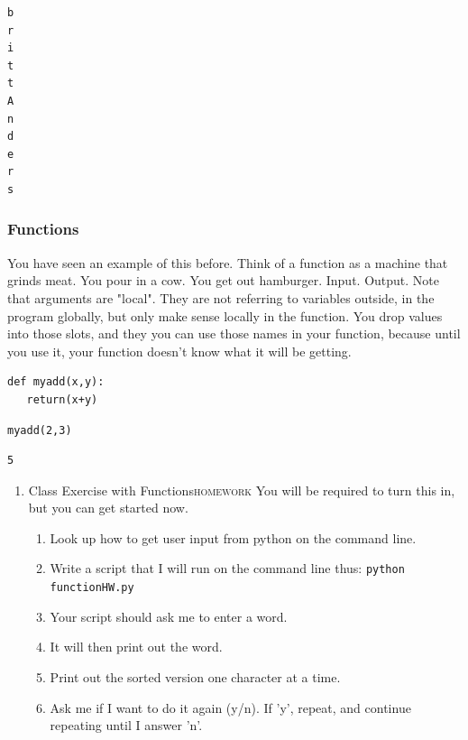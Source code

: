 \documentclass{article}
\begin{document}
\begin{enumerate}
\begin{enumerate}
\begin{verbatim}
b
r
i
t
t
A
n
d
e
r
s
\end{verbatim}
\end{enumerate}
\end{enumerate}

\subsubsection{Functions}
\label{sec:orgee63fe9}
You have seen an example of this before. Think of a function as a machine that grinds meat. You pour in a cow. You get out hamburger. Input. Output. Note that arguments are "local". They are not referring to variables outside, in the program globally, but only make sense locally in the function. You drop values into those slots, and they you can use those names  in your function, because until you use it, your function doesn't know what it will be getting. 
\begin{verbatim}
def myadd(x,y):
   return(x+y)
\end{verbatim}

\begin{verbatim}
myadd(2,3)
\end{verbatim}

\begin{verbatim}
5
\end{verbatim}

\begin{enumerate}
\item Class Exercise with Functions\hfill{}\textsc{homework}
\label{sec:orgdea799b}
You will be required to turn this in, but you can get started now. 
\begin{enumerate}
\item Look up how to get user input from python on the command line.
\item Write a script that I will run on the command line thus:
\texttt{python functionHW.py}
\item Your script should ask me to enter a word.
\item It will then print out the word.
\item Print out the sorted version one character at a time.
\item Ask me if I want to do it again (y/n). If 'y', repeat, and continue repeating until I answer 'n'.
\end{enumerate}
\end{enumerate}
\end{document}
